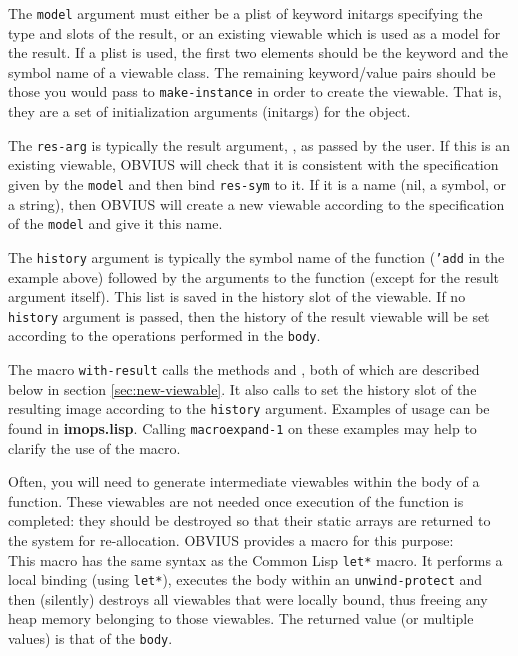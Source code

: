 The {\tt model} argument must either be a plist of keyword initargs
specifying the type and slots of the result, or an existing viewable
which is used as a model for the result.  If a plist is used, the
first two elements should be the keyword  and the symbol
name of a viewable class.  The remaining keyword/value pairs should be
those you would pass to {\tt make-instance} in order to create the
viewable.  That is, they are a set of initialization arguments
(initargs) for the object.

The {\tt res-arg} is typically the result argument, \res, as passed
by the user.  If this is an existing viewable, OBVIUS will check that
it is consistent with the specification given by the {\tt model} and
then bind {\tt res-sym} to it.  If it is a name (nil, a symbol, or a
string), then OBVIUS will create a new viewable according to the
specification of the {\tt model} and give it this name.

The {\tt history} argument is typically the symbol name of the function
({\tt 'add} in the example above) followed by the arguments to the
function (except for the result argument itself).  This list is saved
in the history slot of the viewable.  If no {\tt history} argument is
passed, then the history of the result viewable will be set according
to the operations performed in the {\tt body}. 

The macro {\tt with-result} calls the methods  and
, both of which are described below in section
\ref{sec:new-viewable}.  It also calls
 to set the history slot of the resulting image
according to the {\tt history} argument.  Examples of usage can be
found in {\bf imops.lisp}.  Calling {\tt macroexpand-1} on these
examples may help to clarify the use of the macro.

Often, you will need to generate intermediate viewables within the
body of a function.  These viewables are not needed once execution of
the function is completed: they should be destroyed so that their
static arrays are returned to the system for re-allocation.  OBVIUS
provides a macro for this purpose: \\
This macro has the same syntax as the Common Lisp {\tt let*} macro.
It performs a local binding (using {\tt let*}), executes the body
within an {\tt unwind-protect} and then (silently) destroys all
viewables that were locally bound, thus freeing any heap memory
belonging to those viewables.   The returned value (or multiple values)
is that of the {\tt body}.


